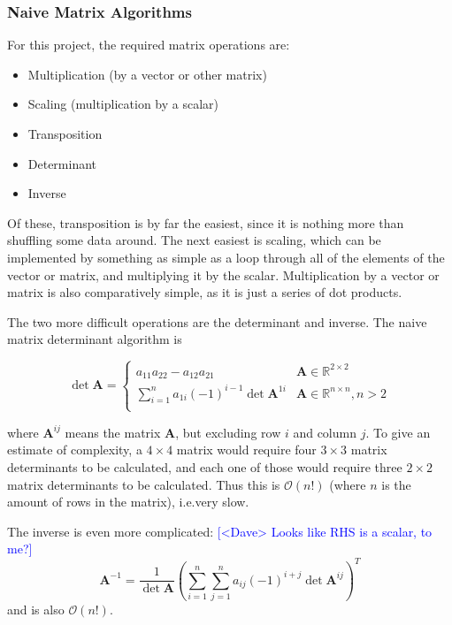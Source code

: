 \documentclass[12pt]{article}
\newcommand{\note}[2][red]{\textcolor{#1}{#2}}
\newcommand{\notedme}[1]{\note[blue]{[<Dave> #1]}}
\begin{document}
\subsubsection{Naive Matrix Algorithms}
\label{naive}

For this project, the required matrix operations are:

\begin{itemize}
	\item Multiplication (by a vector or other matrix)
	\item Scaling (multiplication by a scalar)
	\item Transposition
	\item Determinant
	\item Inverse
\end{itemize}

Of these, transposition is by far the easiest, since it is nothing more than shuffling some data around. The next easiest is scaling, which can be implemented by something as simple as a loop through all of the elements of the vector or matrix, and multiplying it by the scalar. Multiplication by a vector or matrix is also comparatively simple, as it is just a series of dot products.

The two more difficult operations are the determinant and inverse. The naive matrix determinant algorithm is

\begin{equation}
	\det{\mathbf{A}} = 
	\begin{cases}
	a_{11}a_{22} - a_{12}a_{21}& \mathbf{A} \in \mathbb{R}^{2 \times 2}\\
	\sum_{i=1}^{n} a_{1i}  (-1)^{i-1}\det{\mathbf{A}^{1i}} & \mathbf{A} \in \mathbb{R}^{n \times n}, n > 2\\
	\end{cases}
\end{equation}

\noindent
where $\mathbf{A}^{ij}$ means the matrix $\mathbf{A}$, but excluding row $i$ and column $j$. To give an estimate of complexity, a $4\times4$ matrix would require four $3\times3$ matrix determinants to be calculated, and each one of those would require three $2\times2$ matrix determinants to be calculated. Thus this is $\mathcal{O}(n!)$ (where $n$ is the amount of rows in the matrix), i.e.\@ very slow.

The inverse is even more complicated: \notedme{Looks like RHS is a scalar, to me?}
\begin{equation}
	\mathbf{A}^{-1} = \frac{1}{\det{\mathbf{A}}} \left(\sum_{i=1}^{n} \sum_{j=1}^{n} a_{ij} (-1)^{i+j} \det{\mathbf{A}^{ij}}\right)^T
\end{equation}
\noindent
and is also $\mathcal{O}(n!)$.
\end{document}
